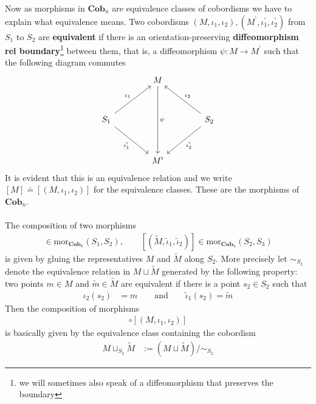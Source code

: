 Now as morphisms in $\mathbf{Cob}_{n}$ are equivalence classes of cobordisms we have to explain what equivalence means. Two cobordisms $(M,\iota_{1},\iota_{2}),(M^{\backprime},\iota_{1}^{\backprime},\iota_{2}^{\backprime})$ from $S_{1}$ to $S_{2}$ are \textbf{equivalent} if there is an orientation-preserving \textbf{diffeomorphism rel boundary}\footnote{we will sometimes also speak of a diffeomorphism that preserves the boundary} between them, that is, a diffeomorphism $\psi \colon M \to M^{\backprime}$ such that the following diagram commutes
\begin{equation*}
\begin{tikzcd}[row sep=3.2em,column sep=4em]
  &
  M
  \ar{dd}{\psi}
  &
  \\
  S_{1}
  \ar{ur}{\iota_{1}}
  \ar{dr}[swap]{\iota_{1}^{\backprime}}
  &
  &
  S_{2}
  \ar{ul}[swap]{\iota_{2}}
  \ar{dl}{\iota_{2}^{\backprime}}
  \\
  &
  M^{\backprime}
  &
\end{tikzcd}
\end{equation*}
It is evident that this is an equivalence relation and we write $[M] \doteq [(M,\iota_{1},\iota_{2})]$ for the equivalence classes. These are the morphisms of $\mathbf{Cob}_{n}$.
\\\\
The composition of two morphisms
\begin{align*}
  [(M,\iota_{1},\iota_{2})]
  \in
  \mathrm{mor}_{\mathbf{Cob}_{n}}(S_{1},S_{2})
  ,\qquad
  [(\tilde{M},\tilde{\iota}_{1},\tilde{\iota}_{2})]
  \in
  \mathrm{mor}_{\mathbf{Cob}_{n}}(S_{2},S_{3})
\end{align*}
is given by gluing the representatives $M$ and $\tilde{M}$ along $S_{2}$. More precisely let $\sim_{S_{2}}$ denote the equivalence relation in $M \sqcup \tilde{M}$ generated by the following property: two points $m \in M$ and $\tilde{m} \in \tilde{M}$ are equivalent if there is a point $s_{2} \in S_{2}$ such that
\begin{align*}
  \iota_{2}(s_{2})
  &=
  m
  \qquad
  \text{and}
  \qquad
  \tilde{\iota}_{1}(s_{2})
  =
  \tilde{m}
\end{align*}
Then the composition of morphisms
\begin{align*}
  [(\tilde{M},\tilde{\iota}_{1},\tilde{\iota}_{2})]
  \circ
  [(M,\iota_{1},\iota_{2})]
\end{align*}
is basically given by the equivalence class containing the cobordism
\begin{align*}
  M
  \sqcup_{S_{2}}
  \tilde{M}
  &:=
  (M \sqcup \tilde{M})
  /
  \sim_{S_{2}}
\end{align*}
